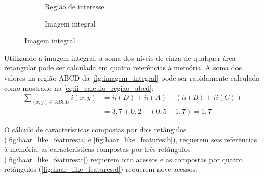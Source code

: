 \begin{figure}[htbp]
\begin{subfigure}[c]{0.3\textwidth}
    \caption{Região de interesse}
    \end{subfigure}%
    \begin{subfigure}[c]{0.3\textwidth}
    \centering
    \caption{Imagem integral}
    \end{subfigure}%
\end{figure}

Utilizando a imagem integral, a soma dos níveis de cinza de qualquer área retangular pode ser calculada em quatro referências à memória. A soma dos valores na região ABCD da \autoref{fig:imagem_integral} pode ser rapidamente calculada como mostrado na \autoref{eq:ii_calculo_regiao_abcd}:
%
\begin{align} \label{eq:ii_calculo_regiao_abcd}
    \sum_{(x,y) \in ABCD} i(x,y) &= ii(D) + ii(A) - (ii(B) + ii(C))\\
                                 &= 3,7 + 0,2 - (0,5 + 1,7) = 1,7\nonumber
\end{align}

O cálculo de características compostas por dois retângulos (\autoref{fig:haar_like_features:a} e \autoref{fig:haar_like_features:b}), requerem seis referências à memória, as características compostas por três retângulos (\autoref{fig:haar_like_features:c}) requerem oito acessos e as compostas por quatro retângulos (\autoref{fig:haar_like_features:d}) requerem nove acessos.


